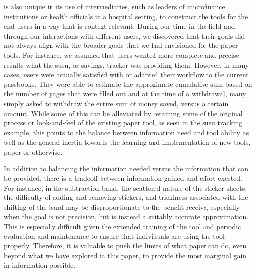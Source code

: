 \documentclass{sig-alternate}
\begin{document}
\nifty is also unique in its use of intermediaries, such as leaders of microfinance institutions or health officials in a hospital setting, to construct the tools for the end users in a way that is context-relevant. During our time in the field and through our interactions with different users, we discovered that their goals did not always align with the broader goals that we had envisioned for the paper tools. For instance, we assumed that users wanted more complete and precise results what the susu, or savings, tracker was providing them. However, in many cases, users were actually satisfied with or adapted their workflow to the current passbooks. They were able to estimate the approximate cumulative sum based on the number of pages that were filled out and at the time of a withdrawal, many simply asked to withdraw the entire sum of money saved, versus a certain amount. While some of this can be alleviated by retaining some of the original process or look-and-feel of the existing paper tool, as seen in the susu tracking example, this points to the balance between information need and tool ability as well as the general inertia towards the learning and implementation of new tools, paper or otherwise.

In addition to balancing the information needed versus the information that can be provided, there is a tradeoff between information gained and effort exerted. For instance, in the subtraction band, the scattered nature of the sticker sheets, the difficulty of adding and removing stickers, and trickiness associated with the shifting of the band may be disproportionate to the benefit receive, especially when the goal is not precision, but is instead a suitably accurate approximation. This is especially difficult given the extended training of the tool and periodic evaluation and maintenance to ensure that individuals are using the tool properly. Therefore, it is valuable to push the limits of what paper can do, even beyond what we have explored in this paper, to provide the most marginal gain in information possible.

\end{document}
